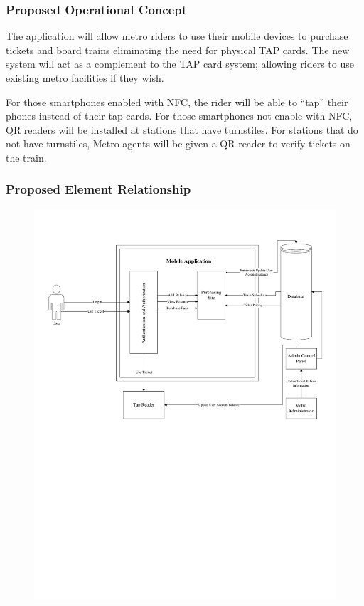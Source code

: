 	\subsubsection{Proposed Operational Concept}
		The application will allow metro riders to use their mobile devices to purchase tickets and board trains eliminating the need for physical TAP cards. The new system will act as a complement to the TAP card system; allowing riders to use existing metro facilities if they wish.
		
		For those smartphones enabled with NFC, the rider will be able to “tap” their phones instead of their tap cards. For those smartphones not enable with NFC, QR readers will be installed at stations that have turnstiles. For stations that do not have turnstiles, Metro agents will be given a QR reader to verify tickets on the train.

	\subsubsection{Proposed Element Relationship}
		\begin{figure}[h]
			\centering
				\includegraphics[scale=0.45]{OCD/er.pdf}
		\end{figure}			
	\newpage
